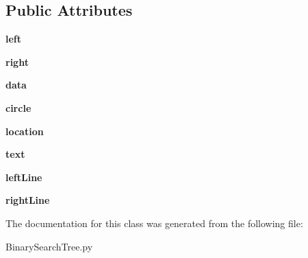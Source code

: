 \subsection*{Public Attributes}
\begin{DoxyCompactItemize}
\item 
{\bfseries left}\hypertarget{class_binary_search_tree_1_1_binary_tree_node_a2a7329ecef9597b0639d5e56d1fb9e98}{}\label{class_binary_search_tree_1_1_binary_tree_node_a2a7329ecef9597b0639d5e56d1fb9e98}

\item 
{\bfseries right}\hypertarget{class_binary_search_tree_1_1_binary_tree_node_a8ec787cb980f443ef91e36adbc07f03b}{}\label{class_binary_search_tree_1_1_binary_tree_node_a8ec787cb980f443ef91e36adbc07f03b}

\item 
{\bfseries data}\hypertarget{class_binary_search_tree_1_1_binary_tree_node_a7dc751865b03d93d7a2eaf8e0453021f}{}\label{class_binary_search_tree_1_1_binary_tree_node_a7dc751865b03d93d7a2eaf8e0453021f}

\item 
{\bfseries circle}\hypertarget{class_binary_search_tree_1_1_binary_tree_node_a06a5a777f647a7fd179e98e6908fb7c9}{}\label{class_binary_search_tree_1_1_binary_tree_node_a06a5a777f647a7fd179e98e6908fb7c9}

\item 
{\bfseries location}\hypertarget{class_binary_search_tree_1_1_binary_tree_node_a5105a9ac24008de97b2243aa8ceb9566}{}\label{class_binary_search_tree_1_1_binary_tree_node_a5105a9ac24008de97b2243aa8ceb9566}

\item 
{\bfseries text}\hypertarget{class_binary_search_tree_1_1_binary_tree_node_acc17cecd9513b2d26b8b1c777d72407f}{}\label{class_binary_search_tree_1_1_binary_tree_node_acc17cecd9513b2d26b8b1c777d72407f}

\item 
{\bfseries left\+Line}\hypertarget{class_binary_search_tree_1_1_binary_tree_node_abef335231af642d070f64122033f2ff7}{}\label{class_binary_search_tree_1_1_binary_tree_node_abef335231af642d070f64122033f2ff7}

\item 
{\bfseries right\+Line}\hypertarget{class_binary_search_tree_1_1_binary_tree_node_a2fb1088533007be5718735e39080f6c9}{}\label{class_binary_search_tree_1_1_binary_tree_node_a2fb1088533007be5718735e39080f6c9}

\end{DoxyCompactItemize}


The documentation for this class was generated from the following file\+:\begin{DoxyCompactItemize}
\item 
Binary\+Search\+Tree.\+py\end{DoxyCompactItemize}
